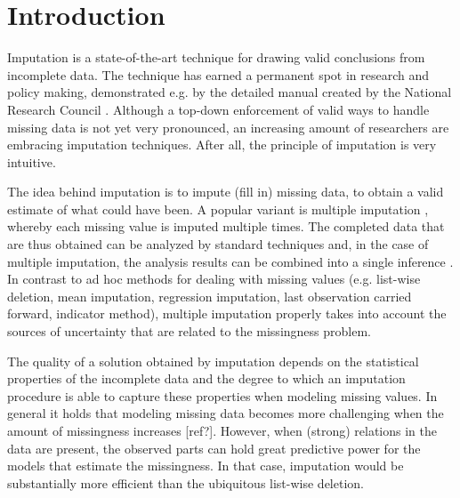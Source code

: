\documentclass[bimj,fleqn]{w-art}
\theoremstyle{plain}
\theoremstyle{definition}
\begin{document}



\section{Introduction}

Imputation is a state-of-the-art technique for drawing valid conclusions from incomplete data. The technique has earned a permanent spot in research and policy making, demonstrated e.g. by the detailed manual created by the National Research Council \citep*{little2012prevention}. Although a top-down enforcement of valid ways to handle missing data is not yet very pronounced, an increasing amount of researchers are embracing imputation techniques. After all, the principle of imputation is very intuitive.

The idea behind imputation is to impute (fill in) missing data, to obtain a valid estimate of what could have been. A popular variant is multiple imputation \citep{rubi76}, whereby each missing value is imputed multiple times. The completed data that are thus obtained can be analyzed by standard techniques and, in the case of multiple imputation, the analysis results can be combined into a single inference \citep[using Rubin's rules][]{rubi87}. In contrast to ad hoc methods for dealing with missing values (e.g. list-wise deletion, mean imputation, regression imputation, last observation carried forward, indicator method), multiple imputation properly takes into account the sources of uncertainty that are related to the missingness problem. 

The quality of a solution obtained by imputation depends on the statistical properties of the incomplete data and the degree to which an imputation procedure is able to capture these properties when modeling missing values. In general it holds that modeling missing data becomes more challenging when the amount of missingness increases [ref?]. However, when (strong) relations in the data are present, the observed parts can hold great predictive power for the models that estimate the missingness. In that case,  imputation would be substantially more efficient than the ubiquitous list-wise deletion.
\end{document}
